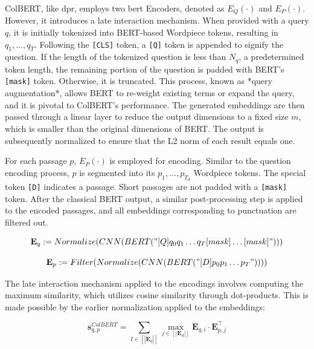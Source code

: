 ColBERT, like \gls{dpr}, employs two \gls{bert} Encoders, denoted as $E_Q\left(\cdot\right)$ and $E_P\left(\cdot\right)$. However, it introduces a late interaction mechanism. When provided with a query $q$, it is initially tokenized into BERT-based Wordpiece tokens, resulting in $q_1, \ldots, q_T$. Following the \verb|[CLS]| token, a \verb|[Q]| token is appended to signify the question. If the length of the tokenized question is less than $N_q$, a predetermined token length, the remaining portion of the question is padded with BERT's \verb|[mask]| token. Otherwise, it is truncated. This process, known as *query augmentation*, allows BERT to re-weight existing terms or expand the query, and it is pivotal to ColBERT's performance. The generated embeddings are then passed through a linear layer to reduce the output dimensions to a fixed size $m$, which is smaller than the original dimensions of BERT. The output is subsequently normalized to ensure that the L2 norm of each result equals one.

For each passage $p$, $E_P\left(\cdot\right)$ is employed for encoding. Similar to the question encoding process, $p$ is segmented into its $p_1, \ldots, p_{T_d}$ Wordpiece tokens. The special token \verb|[D]| indicates a passage. Short passages are not padded with a \verb|[mask]| token. After the classical BERT output, a similar post-processing step is applied to the encoded passages, and all embeddings corresponding to punctuation are filtered out.

\begin{equation}
    \mathbf{E}_{q}:= Normalize(CNN(BERT("[Q] q_0 q_1 \dots q_T [mask] \dots [mask]")))
\end{equation}

\begin{equation}
    \mathbf{E}_{p}:= Filter(Normalize(CNN(BERT("[D]p_0 p_1 \dots p_T"))))
\end{equation}

The late interaction mechanism applied to the encodings involves computing the maximum similarity, which utilizes cosine similarity through dot-products. This is made possible by the earlier normalization applied to the embeddings:

\begin{equation}
    \mathbf{s}_{q, p}^{C o l B E R T}=\sum_{I\in\left[\left|\mathbf{E}_q\right|\right]}\max _{j\in\left[\left|\mathbf{E}_d\right|\right]} \mathbf{E}_{q, i} \cdot \mathbf{E}_{p, j}^{\top}
\end{equation}

